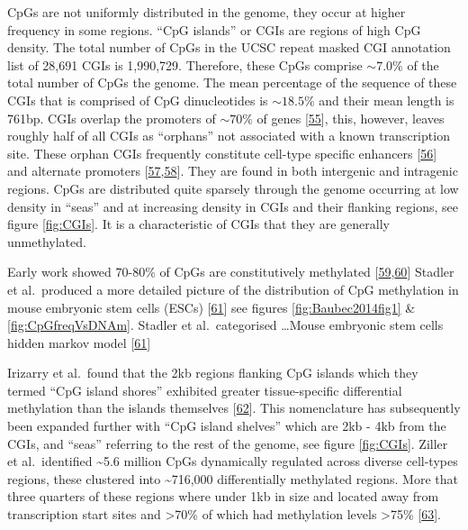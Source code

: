 \documentclass[
]{book}
\begin{document}
CpGs are not uniformly distributed in the genome, they occur at higher frequency in some regions.
``CpG islands'' or CGIs are regions of high CpG density.
The total number of CpGs in the UCSC repeat masked CGI annotation list of 28,691 CGIs is 1,990,729.
Therefore, these CpGs comprise \(\sim7.0\%\) of the total number of CpGs the genome. The mean percentage of the sequence of these CGIs that is comprised of CpG dinucleotides is \(\sim18.5\%\) and their mean length is 761bp.
CGIs overlap the promoters of \(\sim70\%\) of genes {[}\protect\hyperlink{ref-Saxonov2006}{55}{]}, this, however, leaves roughly half of all CGIs as ``orphans'' not associated with a known transcription site.
These orphan CGIs frequently constitute cell-type specific enhancers {[}\protect\hyperlink{ref-Bell2017}{56}{]} and alternate promoters {[}\protect\hyperlink{ref-Illingworth2010}{57},\protect\hyperlink{ref-Maunakea2010}{58}{]}.
They are found in both intergenic and intragenic regions.
CpGs are distributed quite sparsely through the genome occurring at low density in ``seas'' and at increasing density in CGIs and their flanking regions, see figure \ref{fig:CGIs}.
It is a characteristic of CGIs that they are generally unmethylated.

Early work showed 70-80\% of CpGs are constitutively methylated {[}\protect\hyperlink{ref-Ehrlich1982}{59},\protect\hyperlink{ref-Bird2002}{60}{]} Stadler et al.~produced a more detailed picture of the distribution of CpG methylation in mouse embryonic stem cells (ESCs) {[}\protect\hyperlink{ref-Stadler2011}{61}{]} see figures \ref{fig:Baubec2014fig1} \& \ref{fig:CpGfreqVsDNAm}.
Stadler et al.~categorised \ldots Mouse embryonic stem cells hidden markov model {[}\protect\hyperlink{ref-Stadler2011}{61}{]}

Irizarry et al.~found that the 2kb regions flanking CpG islands which they termed ``CpG island shores'' exhibited greater tissue-specific differential methylation than the islands themselves {[}\protect\hyperlink{ref-Irizarry2009}{62}{]}.
This nomenclature has subsequently been expanded further with ``CpG island shelves'' which are 2kb - 4kb from the CGIs, and ``seas'' referring to the rest of the genome, see figure \ref{fig:CGIs}.
Ziller et al.~identified \textasciitilde5.6 million CpGs dynamically regulated across diverse cell-types regions, these clustered into \textasciitilde716,000 differentially methylated regions.
More that three quarters of these regions where under 1kb in size and located away from transcription start sites and \textgreater70\% of which had methylation levels \textgreater75\% {[}\protect\hyperlink{ref-Ziller2013}{63}{]}.
\end{document}
